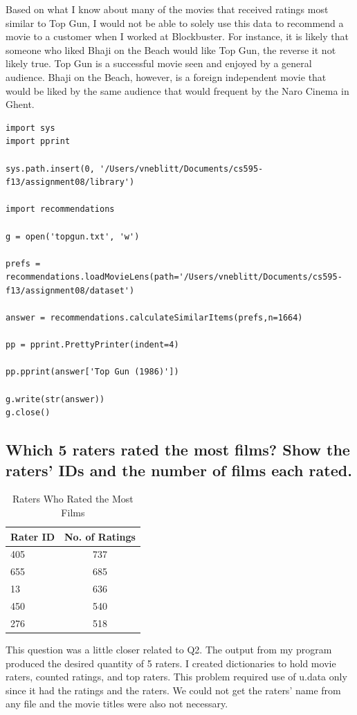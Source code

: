 \documentclass{article}
\begin{document}
Based on what I know about many of the movies that received ratings most similar to Top Gun, I would not be able to solely use this data to recommend a movie to a customer when I worked at Blockbuster. For instance, it is likely that someone who liked Bhaji on the Beach would like Top Gun, the reverse it not likely true. Top Gun is a successful movie seen and enjoyed by a general audience. Bhaji on the Beach, however, is a foreign independent movie that would be liked by the same audience that would frequent by the Naro Cinema in Ghent.

\begin{lstlisting}[frame=single, caption=topgun01.py, label=topgun]
import sys
import pprint

sys.path.insert(0, '/Users/vneblitt/Documents/cs595-f13/assignment08/library')

import recommendations

g = open('topgun.txt', 'w')

prefs = recommendations.loadMovieLens(path='/Users/vneblitt/Documents/cs595-f13/assignment08/dataset')

answer = recommendations.calculateSimilarItems(prefs,n=1664)

pp = pprint.PrettyPrinter(indent=4)

pp.pprint(answer['Top Gun (1986)'])

g.write(str(answer))
g.close()

\end{lstlisting}

\newpage
\subsection{Which 5 raters rated the most films? Show the raters' IDs and the number of films each rated.}

\begin{table}[!h]
\centering
\begin{tabular}{l c}
Rater ID & No. of Ratings \\
\hline
405 & 737  \\
655 & 685  \\
13 & 636  \\
450 & 540  \\
276 & 518  \\
\hline
\end{tabular}
\caption{Raters Who Rated the Most Films}
\end{table}

This question was a little closer related to Q2. The output from my program produced the desired quantity of 5 raters. I created dictionaries to hold movie raters, counted ratings, and top raters. This problem required use of u.data only since it had the ratings and the raters. We could not get the raters' name from any file and the movie titles were also not necessary.
\end{document}
